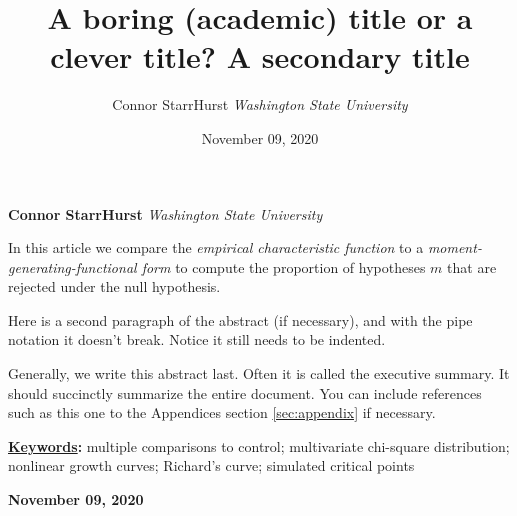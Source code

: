 \documentclass[]{article}
\title{\textbf{\textcolor{WSU.crimson}{A boring (academic) title or a clever title?}} \newline \textbf{\textcolor{WSU.gray}{A secondary title}}  }
\author{\Large Connor StarrHurst\vspace{0.05in} \newline\normalsize\emph{Washington State University}  }
\date{November 09, 2020}
\newcommand*{\authorfont}{\fontfamily{phv}\selectfont}
\renewenvironment{abstract}
 {{%
    \setlength{\leftmargin}{0mm}
    \setlength{\rightmargin}{\leftmargin}%
  }%
  \relax}
 {\endlist}
\begin{document}
	
%

{%
\setlength{\parindent}{0pt}
\thispagestyle{plain}
{\fontsize{18}{20}\selectfont\raggedright 
\maketitle  %

}

{
   \vskip 13.5pt\relax \normalsize\fontsize{11}{12} 
   
\textbf{\authorfont Connor StarrHurst} \hskip 15pt \emph{\small Washington State University}   

}

}








\begin{abstract}

    \hbox{\vrule height .2pt width 39.14pc}

    \vskip 8.5pt %

\noindent In this article we compare the \emph{empirical characteristic function}
\citep{Tukey:1977, Becker:1988} to a
\emph{moment-generating-functional form} to compute the proportion of
hypotheses \(m\) that are rejected under the null hypothesis.
\vspace{0.25in}

\noindent Here is a second paragraph of the abstract (if necessary), and
with the pipe notation it doesn't break. Notice it still needs to be
indented. \vspace{0.25in}

\noindent Generally, we write this abstract last. Often it is called the
executive summary. It should succinctly summarize the entire document.
You can include references such as this one to the Appendices section
\ref{sec:appendix} if necessary.


\vskip 8.5pt \noindent \textbf{\underline{Keywords}:} multiple comparisons to control; multivariate chi-square distribution;
nonlinear growth curves; Richard's curve; simulated critical points \par

    




    
    \hbox{\vrule height .2pt width 39.14pc}
    \vskip 5pt 
    \hfill \textbf{\textcolor{WSU.gray}{ November 09, 2020 } }
    \vskip 5pt 
    
\end{abstract}
\end{document}
